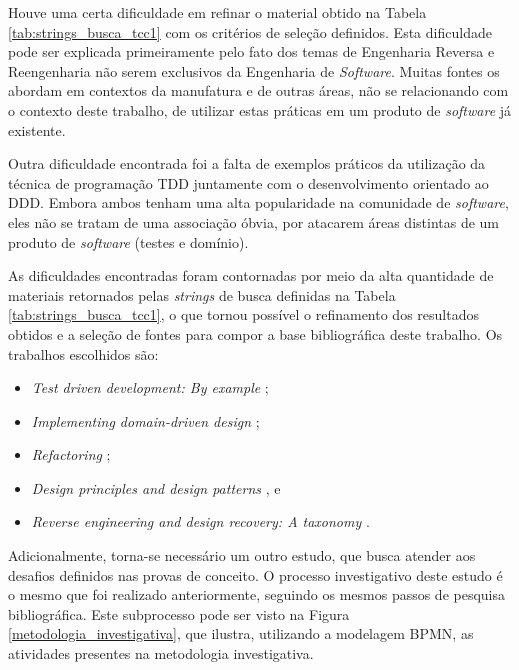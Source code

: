 Houve uma certa dificuldade em refinar o material obtido na Tabela \ref{tab:strings_busca_tcc1} com os 
critérios de seleção definidos. Esta dificuldade pode ser explicada primeiramente 
pelo fato dos temas de Engenharia Reversa e Reengenharia não serem exclusivos da 
Engenharia de \textit{Software}. Muitas fontes os abordam em contextos da manufatura e de 
outras áreas, não se relacionando com o contexto deste trabalho,  de utilizar estas práticas 
em um produto de \textit{software} já existente.

Outra dificuldade encontrada foi a falta de exemplos práticos da utilização da técnica de 
programação TDD juntamente com o desenvolvimento orientado ao DDD. Embora ambos tenham uma 
alta popularidade na comunidade de \textit{software}, eles não se tratam de uma associação 
óbvia, por atacarem áreas distintas de um produto de \textit{software} (testes e domínio).

As dificuldades encontradas foram contornadas por meio da alta quantidade de materiais retornados 
pelas \textit{strings} de busca definidas na Tabela \ref{tab:strings_busca_tcc1}, o que tornou possível o refinamento 
dos resultados obtidos e a seleção de fontes para compor a base bibliográfica deste trabalho. 
Os trabalhos escolhidos são:

\begin{itemize}
  \item \textit{Test driven development: By example} \cite{beck2022test};
  \item \textit{Implementing domain-driven design} \cite{vernon2013implementing};
  \item \textit{Refactoring} \cite{fowler2018refactoring};
  \item \textit{Design principles and design patterns} \cite{martin2000design}, e
  \item \textit{Reverse engineering and design recovery: A taxonomy} \cite{chikofsky1990reverse}.
\end{itemize}

Adicionalmente, torna-se necessário um outro estudo, que busca atender aos desafios definidos nas provas de conceito. 
O processo investigativo deste estudo é o mesmo que foi realizado anteriormente, 
seguindo os mesmos passos de pesquisa bibliográfica. Este subprocesso pode ser visto na 
Figura \ref{metodologia_investigativa}, que ilustra, utilizando a modelagem BPMN, as atividades presentes na metodologia investigativa.

